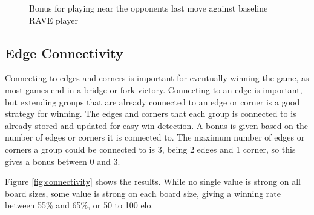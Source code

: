 \begin{figure}
	\centering
{}
	\caption{Bonus for playing near the opponents last move against baseline RAVE player}
	\label{fig:localreply}
\end{figure}


\subsection{Edge Connectivity}

Connecting to edges and corners is important for eventually winning the game, as most games end in a bridge or fork victory. Connecting to an edge is important, but extending groups that are already connected to an edge or corner is a good strategy for winning. The edges and corners that each group is connected to is already stored and updated for easy win detection. A bonus is given based on the number of edges or corners it is connected to. The maximum number of edges or corners a group could be connected to is 3, being 2 edges and 1 corner, so this gives a bonus between 0 and 3.

Figure \ref{fig:connectivity} shows the results. While no single value is strong on all board sizes, some value is strong on each board size, giving a winning rate between 55\% and 65\%, or 50 to 100 elo.

